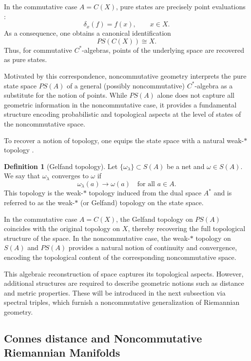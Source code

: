 \documentclass[12pt]{article}
\theoremstyle{definition} %
\newtheorem{definition}{Definition}
\theoremstyle{plain} %
\theoremstyle{remark} %
\theoremstyle{underline}
\begin{document}
In the commutative case $A=C(X)$, pure states are precisely point evaluations \cite{Landi:1997sh}:
\[
    \delta_x(f) = f(x), \qquad x\in X.
\]
As a consequence, one obtains a canonical identification
\[
    PS(C(X)) \cong X.
\]
Thus, for commutative $C^*$-algebras, points of the underlying space are recovered as pure states.

Motivated by this correspondence, noncommutative geometry interprets the pure state space $PS(A)$ of a general (possibly noncommutative) $C^*$-algebra as a substitute for the notion of points. While $PS(A)$ alone does not capture all geometric information in the noncommutative case, it provides a fundamental structure encoding probabilistic and topological aspects at the level of states of the noncommutative space.

\medskip

To recover a notion of topology, one equips the state space with a natural weak-$*$ topology \cite{Landi:1997sh}.

\begin{definition}[Gelfand topology]
Let $\{\omega_\lambda\}\subset S(A)$ be a net and $\omega\in S(A)$. We say that $\omega_\lambda$ converges to $\omega$ if
\[
    \omega_\lambda(a) \to \omega(a) \quad \text{for all } a\in A.
\]
This topology is the weak-$*$ topology induced from the dual space $A^*$ and is referred to as the weak-$*$ (or Gelfand) topology on the state space.
\end{definition}

In the commutative case $A=C(X)$, the Gelfand topology on $PS(A)$ coincides with the original topology on $X$, thereby recovering the full topological structure of the space. In the noncommutative case, the weak-$*$ topology on $S(A)$ and $PS(A)$ provides a natural notion of continuity and convergence, encoding the topological content of the corresponding noncommutative space.

This algebraic reconstruction of space captures its topological aspects. However, additional structures are required to describe geometric notions such as distance and metric properties. These will be introduced in the next subsection via spectral triples, which furnish a noncommutative generalization of Riemannian geometry.





\subsection{Connes distance and Noncommutative Riemannian Manifolds}
\end{document}

